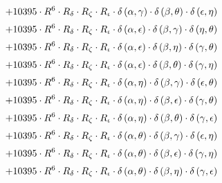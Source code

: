 \begin{subequations}
\begin{gather}
 \\[0.2em] \notag 		 + 10395 \cdot R^{6} \cdot R_{\delta{}} \cdot R_{\zeta{}} \cdot R_{\iota{}} \cdot \delta{}\left(\alpha{}, \gamma{}\right) \cdot \delta{}\left(\beta{}, \theta{}\right) \cdot \delta{}\left(\epsilon{}, \eta{}\right) 
 \\[0.2em] \notag 		 + 10395 \cdot R^{6} \cdot R_{\delta{}} \cdot R_{\zeta{}} \cdot R_{\iota{}} \cdot \delta{}\left(\alpha{}, \epsilon{}\right) \cdot \delta{}\left(\beta{}, \gamma{}\right) \cdot \delta{}\left(\eta{}, \theta{}\right) 
 \\[0.2em] \notag 		 + 10395 \cdot R^{6} \cdot R_{\delta{}} \cdot R_{\zeta{}} \cdot R_{\iota{}} \cdot \delta{}\left(\alpha{}, \epsilon{}\right) \cdot \delta{}\left(\beta{}, \eta{}\right) \cdot \delta{}\left(\gamma{}, \theta{}\right) 
 \\[0.2em] \notag 		 + 10395 \cdot R^{6} \cdot R_{\delta{}} \cdot R_{\zeta{}} \cdot R_{\iota{}} \cdot \delta{}\left(\alpha{}, \epsilon{}\right) \cdot \delta{}\left(\beta{}, \theta{}\right) \cdot \delta{}\left(\gamma{}, \eta{}\right) 
 \\[0.2em] \notag 		 + 10395 \cdot R^{6} \cdot R_{\delta{}} \cdot R_{\zeta{}} \cdot R_{\iota{}} \cdot \delta{}\left(\alpha{}, \eta{}\right) \cdot \delta{}\left(\beta{}, \gamma{}\right) \cdot \delta{}\left(\epsilon{}, \theta{}\right) 
 \\[0.2em] \notag 		 + 10395 \cdot R^{6} \cdot R_{\delta{}} \cdot R_{\zeta{}} \cdot R_{\iota{}} \cdot \delta{}\left(\alpha{}, \eta{}\right) \cdot \delta{}\left(\beta{}, \epsilon{}\right) \cdot \delta{}\left(\gamma{}, \theta{}\right) 
 \\[0.2em] \notag 		 + 10395 \cdot R^{6} \cdot R_{\delta{}} \cdot R_{\zeta{}} \cdot R_{\iota{}} \cdot \delta{}\left(\alpha{}, \eta{}\right) \cdot \delta{}\left(\beta{}, \theta{}\right) \cdot \delta{}\left(\gamma{}, \epsilon{}\right) 
 \\[0.2em] \notag 		 + 10395 \cdot R^{6} \cdot R_{\delta{}} \cdot R_{\zeta{}} \cdot R_{\iota{}} \cdot \delta{}\left(\alpha{}, \theta{}\right) \cdot \delta{}\left(\beta{}, \gamma{}\right) \cdot \delta{}\left(\epsilon{}, \eta{}\right) 
 \\[0.2em] \notag 		 + 10395 \cdot R^{6} \cdot R_{\delta{}} \cdot R_{\zeta{}} \cdot R_{\iota{}} \cdot \delta{}\left(\alpha{}, \theta{}\right) \cdot \delta{}\left(\beta{}, \epsilon{}\right) \cdot \delta{}\left(\gamma{}, \eta{}\right) 
 \\[0.2em] \notag 		 + 10395 \cdot R^{6} \cdot R_{\delta{}} \cdot R_{\zeta{}} \cdot R_{\iota{}} \cdot \delta{}\left(\alpha{}, \theta{}\right) \cdot \delta{}\left(\beta{}, \eta{}\right) \cdot \delta{}\left(\gamma{}, \epsilon{}\right) 

\end{gather}
\end{subequations}
